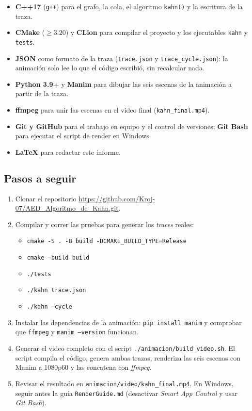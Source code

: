 \documentclass[a4paper, table]{article}
\begin{document}
\begin{itemize}
    \item \textbf{C++17} (\texttt{g++}) para el grafo, la cola, el algoritmo \texttt{kahn()} y la escritura de la traza.
    \item \textbf{CMake} ($\geq 3.20$) y \textbf{CLion} para compilar el proyecto y los ejecutables \texttt{kahn} y \texttt{tests}.
    \item \textbf{JSON} como formato de la traza (\texttt{trace.json} y \texttt{trace\_cycle.json}): la animación solo lee lo que el código escribió, sin recalcular nada.
    \item \textbf{Python 3.9+} y \textbf{Manim} para dibujar las seis escenas de la animación a partir de la traza.
    \item \textbf{ffmpeg} para unir las escenas en el video final (\texttt{kahn\_final.mp4}).
    \item \textbf{Git y GitHub} para el trabajo en equipo y el control de versiones; \textbf{Git Bash} para ejecutar el script de render en Windows.
    \item \textbf{\LaTeX} para redactar este informe.
\end{itemize}

\subsection{Pasos a seguir}

\begin{enumerate}
    \item Clonar el repositorio \url{https://github.com/Kroj-07/AED_Algoritmo_de_Kahn.git}.
    \item Compilar y correr las pruebas para generar los \textit{traces} reales:
    \begin{itemize}
        \item[] \texttt{cmake -S . -B build -DCMAKE\_BUILD\_TYPE=Release}
        \item[] \texttt{cmake --build build}
        \item[] \texttt{./tests}
        \item[] \texttt{./kahn trace.json}
        \item[] \texttt{./kahn --cycle}
    \end{itemize}
    \item Instalar las dependencias de la animación: \texttt{pip install manim} y comprobar que \texttt{ffmpeg} y \texttt{manim --version} funcionan.
    \item Generar el video completo con el script \texttt{./animacion/build\_video.sh}. El script compila el código, genera ambas trazas, renderiza las seis escenas con Manim a 1080p60 y las concatena con \textit{ffmpeg}.
    \item Revisar el resultado en \texttt{animacion/video/kahn\_final.mp4}. En Windows, seguir antes la guía \texttt{RenderGuide.md} (desactivar \textit{Smart App Control} y usar \textit{Git Bash}).
\end{enumerate}
\end{document}
